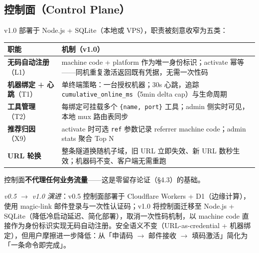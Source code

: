 \documentclass[10pt,a4paper]{article}
\begin{document}
\subsection{控制面（Control Plane）}
v1.0 部署于 Node.js + SQLite（本地或 VPS），职责被刻意收窄为五类：

\begin{longtable}{@{}p{3.6cm}p{10.2cm}@{}}
\toprule
职能 & 机制（v1.0）\\
\midrule
\textbf{无码自动注册}（L1） & machine code + platform 作为唯一身份标识；activate 幂等——同机重复激活返回既有凭据，无需一次性码\\
\addlinespace[2pt]
\textbf{机器绑定 + 心跳}（T1） & 单终端策略：一台授权机器；30s 心跳，追踪 \texttt{cumulative\_online\_ms}（5min delta cap）与生命周期\\
\addlinespace[2pt]
\textbf{工具管理}（T2） & 每绑定可挂载多个 \texttt{\{name, port\}} 工具；admin 侧实时可见，本地 mux 路由表同步\\
\addlinespace[2pt]
\textbf{推荐归因}（X9） & activate 时可选 \texttt{ref} 参数记录 referrer machine code；admin stats 聚合 Top N\\
\addlinespace[2pt]
\textbf{URL 轮换} & 整条隧道换随机子域，旧 URL 立即失效、新 URL 数秒生效；机器码不变、客户端无需重跑\\
\bottomrule
\end{longtable}

\noindent 控制面\textbf{不代理任何业务流量}——这是零留存论证（§4.3）的基础。

\noindent\textit{v0.5 $\rightarrow$ v1.0 演进}：v0.5 控制面部署于 Cloudflare Workers + D1（边缘计算），使用 magic-link 邮件登录与一次性认证码；v1.0 将控制面迁移至 Node.js + SQLite（降低冷启动延迟、简化部署），取消一次性码机制，以 machine code 直接作为身份标识实现无码自动注册。安全语义不变（URL-as-credential + 机器绑定），但用户摩擦进一步降低：从「申请码 $\rightarrow$ 邮件接收 $\rightarrow$ 填码激活」简化为「一条命令即完成」。
\end{document}
